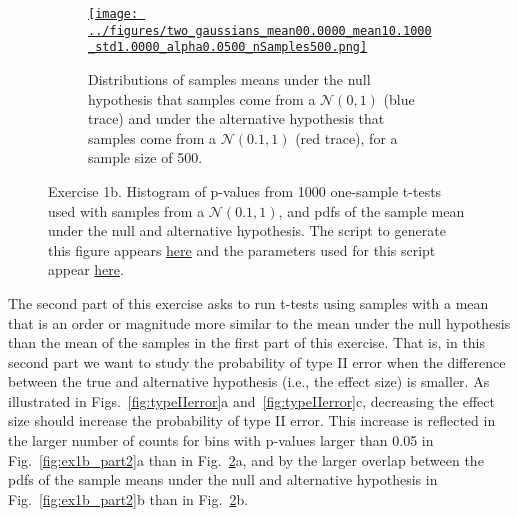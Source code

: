 \documentclass[12pt]{article}
\begin{document}
\begin{enumerate}[(a)]
\begin{figure}[H]
\begin{center}
\begin{subfigure}{0.4\textwidth}
                    \centering
                    \href{https://www.gatsby.ucl.ac.uk/~rapela/neuroinformatics/2023/ws1/figures/two_gaussians_mean00.0000_mean10.1000_std1.0000_alpha0.0500_nSamples500.html}{\texttt{[image: ../figures/two\_gaussians\_mean00.0000\_mean10.1000\_std1.0000\_alpha0.0500\_nSamples500.png]}}
                    \caption{Distributions of samples means under the null
                    hypothesis that samples come from a $\mathcal{N}(0, 1)$
                    (blue trace) and under the alternative hypothesis that
                    samples come from a $\mathcal{N}(0.1, 1)$ (red trace), for
                    a sample size of 500.}
                    \label{fig:ex1b_part1_d}
                \end{subfigure}

                \caption{Exercise 1b. Histogram of p-values from 1000
                one-sample t-tests used with samples from a $\mathcal{N}(0.1,
                1)$, and pdfs of the sample mean under  the null and
                alternative hypothesis.  The script to generate this figure
                appears
                \href{https://github.com/joacorapela/neuroinformatics23/blob/master/worksheets/ws1/mySolution/code/scripts/doEx1WithErrorBars.py}{here}
                and the parameters used for this script appear
                \href{https://github.com/joacorapela/neuroinformatics23/blob/master/worksheets/ws1/mySolution/code/scripts/doEx1bWithErrorBars.csh}{here}.}

                \label{fig:ex1b_part1}
            \end{center}
        \end{figure}

        The second part of this exercise asks to run t-tests using samples with
        a mean that is an order or magnitude more similar to the mean under the
        null hypothesis than the mean of the samples in the first part of this
        exercise. That is, in this second part we want to study the probability
        of type II error when the difference between the true and alternative
        hypothesis (i.e., the effect size) is smaller. As illustrated in
        Figs.~\ref{fig:typeIIerror}a and~\ref{fig:typeIIerror}c, decreasing the
        effect size should increase the probability of type II error. This
        increase is reflected in the larger number of counts for bins with
        p-values larger than 0.05 in Fig.~\ref{fig:ex1b_part2}a than in
        Fig.~\ref{fig:ex1b_part1}a, and by the larger overlap between the pdfs
        of the sample means under the null and alternative hypothesis in
        Fig.~\ref{fig:ex1b_part2}b than in Fig.~\ref{fig:ex1b_part1}b. 


\end{enumerate}
\end{document}
